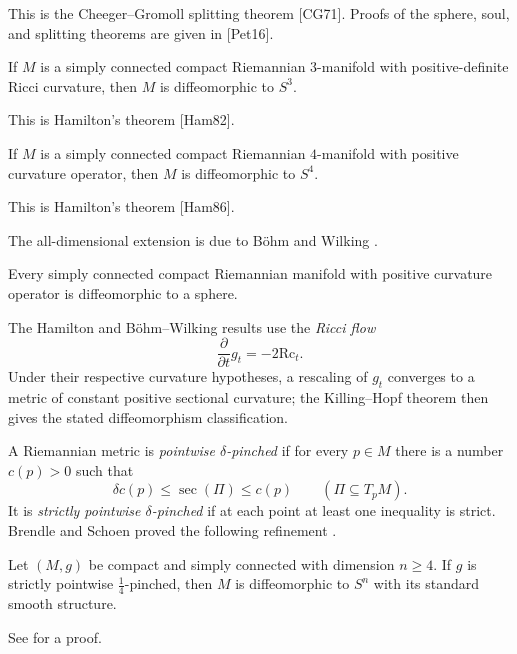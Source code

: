 This is the Cheeger--Gromoll splitting theorem [CG71]. Proofs of the sphere,
soul, and splitting theorems are given in [Pet16].

\begin{theorem}
\label{thm:hamilton-3-manifold}

If $M$ is a simply connected compact Riemannian $3$-manifold with
positive-definite Ricci curvature, then $M$ is diffeomorphic to $S^3$.
\end{theorem}

This is Hamilton's theorem [Ham82].

\begin{theorem}
\label{thm:hamilton-4-manifold}

If $M$ is a simply connected compact Riemannian $4$-manifold with positive
curvature operator, then $M$ is diffeomorphic to $S^4$.
\end{theorem}

This is Hamilton's theorem [Ham86].

The all-dimensional extension is due to Böhm and Wilking \cite{BW08}.

\begin{theorem}
\label{thm:bohm-wilking}

Every simply connected compact Riemannian manifold with positive curvature
operator is diffeomorphic to a sphere.
\end{theorem}

The Hamilton and Böhm--Wilking results use the \emph{Ricci flow}
\[
\frac{\partial}{\partial t}g_t=-2\mathrm{Rc}_t.
\]
Under their respective curvature hypotheses, a rescaling of $g_t$ converges
to a metric of constant positive sectional curvature; the Killing--Hopf
theorem then gives the stated diffeomorphism classification.

A Riemannian metric is \emph{pointwise $\delta$-pinched} if for every
$p\in M$ there is a number $c(p)>0$ such that
\[
\delta c(p)\leq\sec(\Pi)\leq c(p)
\qquad(\Pi\subseteq T_pM).
\]
It is \emph{strictly pointwise $\delta$-pinched} if at each point at least
one inequality is strict. Brendle and Schoen proved the following refinement
\cite{BS09}.

\begin{theorem}
\label{thm:differentiable-sphere-theorem}

Let $(M,g)$ be compact and simply connected with dimension $n\geq4$. If $g$
is strictly pointwise $\frac14$-pinched, then $M$ is diffeomorphic to $S^n$
with its standard smooth structure.
\end{theorem}

See \cite{Bre10} for a proof.

